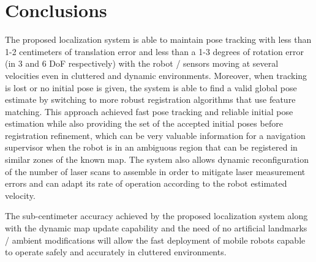 \section{Conclusions}\label{sec:conclusions}

The proposed localization system is able to maintain pose tracking with less than 1-2 centimeters of translation error and less than a 1-3 degrees of rotation error (in 3 and 6 DoF respectively) with the robot / sensors moving at several velocities even in cluttered and dynamic environments. Moreover, when tracking is lost or no initial pose is given, the system is able to find a valid global pose estimate by switching to more robust registration algorithms that use feature matching. This approach achieved fast pose tracking and reliable initial pose estimation while also providing the set of the accepted initial poses before registration refinement, which can be very valuable information for a navigation supervisor when the robot is in an ambiguous region that can be registered in similar zones of the known map. The system also allows dynamic reconfiguration of the number of laser scans to assemble in order to mitigate laser measurement errors and can adapt its rate of operation according to the robot estimated velocity.

The sub-centimeter accuracy achieved by the proposed localization system along with the dynamic map update capability and the need of no artificial landmarks / ambient modifications will allow the fast deployment of mobile robots capable to operate safely and accurately in cluttered environments.
